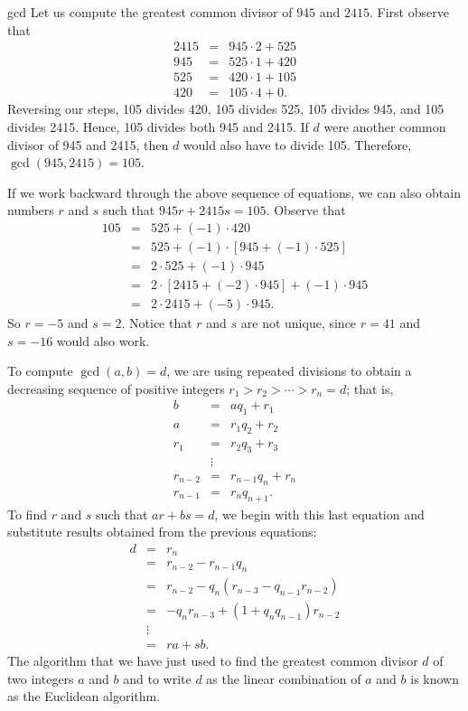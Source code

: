 \begin{example}{gcd}
Let us compute the greatest common divisor of $945$ and $2415$.  First observe that 
\begin{eqnarray*}
2415 & = & 945 \cdot 2 + 525 \\
945 & = & 525 \cdot 1 + 420 \\
525 & = & 420 \cdot 1 + 105 \\
420 & = & 105 \cdot 4 + 0.
\end{eqnarray*}
Reversing our steps, 105 divides 420, 105 divides 525, 105 divides 945, and 105 divides 2415.  Hence, 105 divides both 945 and 2415.  If $d$ were another common divisor of 945 and 2415, then $d$ would also have to divide 105.  Therefore, $\gcd( 945, 2415 ) = 105$.

If we work backward through the above sequence of equations, we can also obtain numbers $r$ and $s$ such that $945 r + 2415 s = 105$.  Observe that 
\begin{eqnarray*}
105 & = & 525 + (-1) \cdot 420 \\
& = & 525 + (-1) \cdot [945 + (-1) \cdot 525] \\
& = & 2 \cdot 525 + (-1) \cdot 945 \\
& = & 2 \cdot [2415 + (-2) \cdot 945] + (-1) \cdot 945 \\
& = & 2 \cdot 2415 + (-5) \cdot 945.
\end{eqnarray*}
So $r = -5$ and $s= 2$.  Notice that $r$ and $s$ are not unique, since $r = 41$ and $s = -16$ would also work.
\end{example}

To compute $\gcd(a,b) = d$, we are using repeated divisions to obtain a decreasing sequence of positive integers $r_1 > r_2 > \cdots > r_n = d$; that is,
\begin{eqnarray*}
b & = & a q_1 + r_1 \\
a & = & r_1 q_2 + r_2 \\
r_1 & = & r_2 q_3 + r_3 \\
& \vdots & \\
r_{n - 2} & = & r_{n - 1} q_{n} + r_{n} \\
r_{n - 1} & = & r_n q_{n + 1}.
\end{eqnarray*}
To find $r$ and $s$ such that $ar + bs = d$, we begin with this last equation and substitute results obtained from the previous equations:
\begin{eqnarray*}
d & = & r_n \\
& = & r_{n - 2} - r_{n - 1} q_n \\
& = & r_{n - 2} - q_n( r_{n - 3} - q_{n - 1} r_{n - 2} ) \\
& = & -q_n r_{n - 3} + ( 1+ q_n q_{n-1} ) r_{n - 2}  \\
& \vdots & \\
& = & ra + sb.
\end{eqnarray*}
The algorithm that we have just used to find the greatest common divisor $d$ of two integers $a$ and $b$ and to write $d$ as the linear combination of $a$ and $b$ is known as the {\bfi Euclidean algorithm}.  
 
